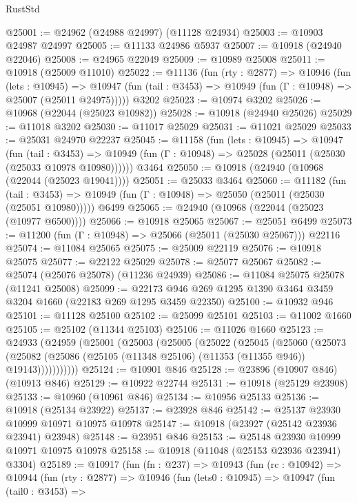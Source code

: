 \begin{lexlean}{RustStd}
\begin{coremodule}
{{{{{{{{{{{{{{{{{{{@25001 := @24962 (@24988 @24997) (@11128 @24934)
@25003 := @10903 @24987 @24997
@25005 := @11133 @24986 @5937
@25007 := @10918 (@24940 @22046)
@25008 := @24965 @22049
@25009 := @10989 @25008
@25011 := @10918 (@25009 @11010)
@25022 := @11136
    (fun (rty : @2877) =>
    @10946
      (fun (lets : @10945) =>
      @10947 (fun (tail : @3453) => @10949 (fun (Γ : @10948) => @25007 (@25011 @24975)))))
    @3202
@25023 := @10974 @3202
@25026 := @10968 (@22044 (@25023 @10982))
@25028 := @10918 (@24940 @25026)
@25029 := @11018 @3202
@25030 := @11017 @25029
@25031 := @11021 @25029
@25033 := @25031 @24970 @22237
@25045 := @11158
    (fun (lets : @10945) =>
    @10947
      (fun (tail : @3453) =>
      @10949 (fun (Γ : @10948) => @25028 (@25011 (@25030 (@25033 @10978 @10980))))))
    @3464
@25050 := @10918 (@24940 (@10968 (@22044 (@25023 @19041))))
@25051 := @25033 @3464
@25060 := @11182
    (fun (tail : @3453) => @10949 (fun (Γ : @10948) => @25050 (@25011 (@25030 (@25051 @10980)))))
    @6499
@25065 := @24940 (@10968 (@22044 (@25023 (@10977 @6500))))
@25066 := @10918 @25065
@25067 := @25051 @6499
@25073 := @11200 (fun (Γ : @10948) => @25066 (@25011 (@25030 @25067))) @22116
@25074 := @11084 @25065
@25075 := @25009 @22119
@25076 := @10918 @25075
@25077 := @22122 @25029
@25078 := @25077 @25067
@25082 := @25074 (@25076 @25078) (@11236 @24939)
@25086 := @11084 @25075 @25078 (@11241 @25008)
@25099 := @22173 @946 @269 @1295 @1390 @3464 @3459 @3204 @1660 (@22183 @269 @1295 @3459 @22350)
@25100 := @10932 @946
@25101 := @11128 @25100
@25102 := @25099 @25101
@25103 := @11002 @1660
@25105 := @25102 (@11344 @25103)
@25106 := @11026 @1660
@25123 := @24933
    (@24959
      (@25001
        (@25003
          (@25005
            (@25022
              (@25045
                (@25060
                  (@25073
                    (@25082 (@25086 (@25105 (@11348 @25106) (@11353 (@11355 @946)) @19143)))))))))))
@25124 := @10901 @846
@25128 := @23896 (@10907 @846) (@10913 @846)
@25129 := @10922 @22744
@25131 := @10918 (@25129 @23908)
@25133 := @10960 (@10961 @846)
@25134 := @10956 @25133
@25136 := @10918 (@25134 @23922)
@25137 := @23928 @846
@25142 := @25137 @23930 @10999 @10971 @10975 @10978
@25147 := @10918 (@23927 (@25142 @23936 @23941) @23948)
@25148 := @23951 @846
@25153 := @25148 @23930 @10999 @10971 @10975 @10978
@25158 := @10918 (@11048 (@25153 @23936 @23941) @3304)
@25189 := @10917
    (fun (fn : @237) =>
    @10943
      (fun (rc : @10942) =>
      @10944
        (fun (rty : @2877) =>
        @10946
          (fun (lets0 : @10945) =>
          @10947
            (fun (tail0 : @3453) =>
}}}}}}}}}}}}}}}}}}}
\end{coremodule}
\end{lexlean}

